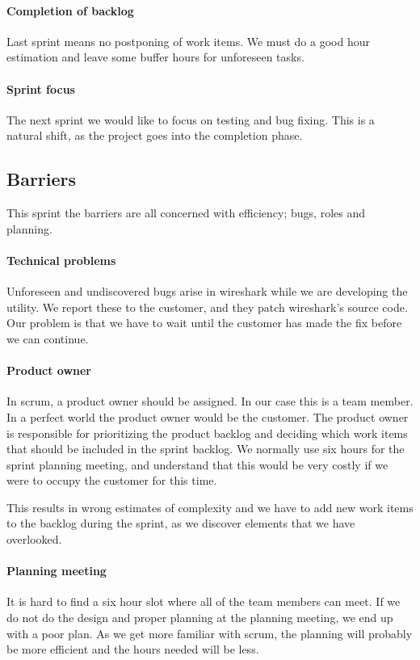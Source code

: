 \paragraph{Completion of backlog}
Last sprint means no postponing of work items. We must do a good hour estimation and leave some buffer hours for unforeseen tasks.
\paragraph{Sprint focus}
The next sprint we would like to focus on testing and bug fixing. This is a natural shift, as the project goes into the completion phase. 

\subsection{Barriers}
This sprint the barriers are all concerned with efficiency; bugs, roles and planning.
\paragraph{Technical problems} 
Unforeseen and undiscovered bugs arise in \Gls{wireshark} while we are developing the \gls{utility}. We report these to the customer, and they patch \Gls{wireshark}'s source code. Our problem is that we have to wait until the customer has made the fix before we can continue.

\paragraph{Product owner}
In \Gls{scrum}, a product owner should be assigned. In our case this is a team member. In a perfect world the product owner would be the customer. The product owner is responsible for prioritizing the product backlog and deciding which work items that should be included in the sprint backlog. We normally use six hours for the sprint planning meeting, and understand that this would be very costly if we were to occupy the customer for this time.

This results in wrong estimates of complexity and we have to add new work items to the backlog during the sprint, as we discover elements that we have overlooked. 

\paragraph{Planning meeting}
It is hard to find a six hour slot where all of the team members can meet. If we do not do the design and proper planning at the planning meeting, we end up with a poor plan. As we get more familiar with \Gls{scrum}, the planning will probably be more efficient and the hours needed will be less. 

